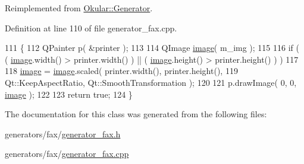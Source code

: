 Reimplemented from \hyperlink{classOkular_1_1Generator_aa786d406a1b0db6679a3bc62bbe2dc82}{Okular\+::\+Generator}.



Definition at line 110 of file generator\+\_\+fax.\+cpp.


\begin{DoxyCode}
111 \{
112     QPainter p( &printer );
113 
114     QImage \hyperlink{classFaxGenerator_ac41d5d048aadf8640da77d95458e7b36}{image}( m\_img );
115 
116     \textcolor{keywordflow}{if} ( ( \hyperlink{classFaxGenerator_ac41d5d048aadf8640da77d95458e7b36}{image}.width() > printer.width() ) || ( \hyperlink{classFaxGenerator_ac41d5d048aadf8640da77d95458e7b36}{image}.height() > printer.height() ) )
117 
118         \hyperlink{classFaxGenerator_ac41d5d048aadf8640da77d95458e7b36}{image} = \hyperlink{classFaxGenerator_ac41d5d048aadf8640da77d95458e7b36}{image}.scaled( printer.width(), printer.height(),
119                               Qt::KeepAspectRatio, Qt::SmoothTransformation );
120 
121     p.drawImage( 0, 0, \hyperlink{classFaxGenerator_ac41d5d048aadf8640da77d95458e7b36}{image} );
122 
123     \textcolor{keywordflow}{return} \textcolor{keyword}{true};
124 \}
\end{DoxyCode}


The documentation for this class was generated from the following files\+:\begin{DoxyCompactItemize}
\item 
generators/fax/\hyperlink{generator__fax_8h}{generator\+\_\+fax.\+h}\item 
generators/fax/\hyperlink{generator__fax_8cpp}{generator\+\_\+fax.\+cpp}\end{DoxyCompactItemize}
